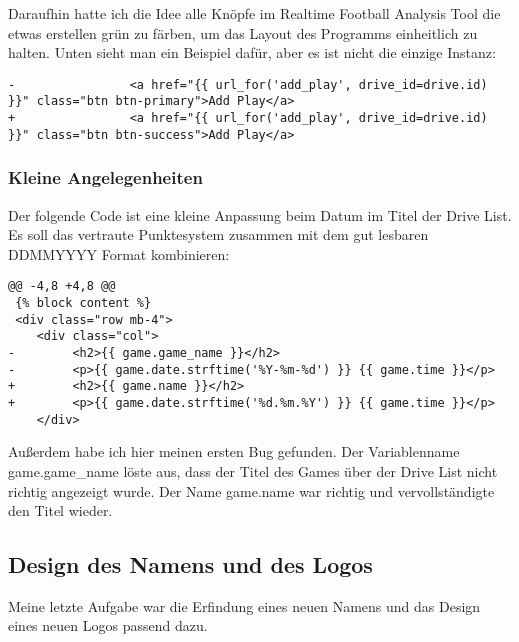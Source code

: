 Daraufhin hatte ich die Idee alle Knöpfe im Realtime Football Analysis Tool die etwas erstellen grün zu färben, um das Layout des Programms einheitlich zu halten. Unten sieht man ein Beispiel dafür, aber es ist nicht die einzige Instanz:

\begin{verbatim}
-                <a href="{{ url_for('add_play', drive_id=drive.id) }}" class="btn btn-primary">Add Play</a>
+                <a href="{{ url_for('add_play', drive_id=drive.id) }}" class="btn btn-success">Add Play</a>
\end{verbatim}


\subsubsection{Kleine Angelegenheiten}
Der folgende Code ist eine kleine Anpassung beim Datum im Titel der Drive List. Es soll das vertraute Punktesystem zusammen mit dem gut lesbaren DDMMYYYY Format kombinieren:
\begin{verbatim}
@@ -4,8 +4,8 @@
 {% block content %}
 <div class="row mb-4">
	<div class="col">
-        <h2>{{ game.game_name }}</h2>
-        <p>{{ game.date.strftime('%Y-%m-%d') }} {{ game.time }}</p>
+        <h2>{{ game.name }}</h2>
+        <p>{{ game.date.strftime('%d.%m.%Y') }} {{ game.time }}</p>
	</div>
\end{verbatim}

Außerdem habe ich hier meinen ersten Bug gefunden. Der Variablenname game.game\_name löste aus, dass der Titel des Games über der Drive List nicht richtig angezeigt wurde. Der Name game.name war richtig und vervollständigte den Titel wieder.

\pagebreak

\subsection{Design des Namens und des Logos}
Meine letzte Aufgabe war die Erfindung eines neuen Namens und das Design eines neuen Logos passend dazu.

